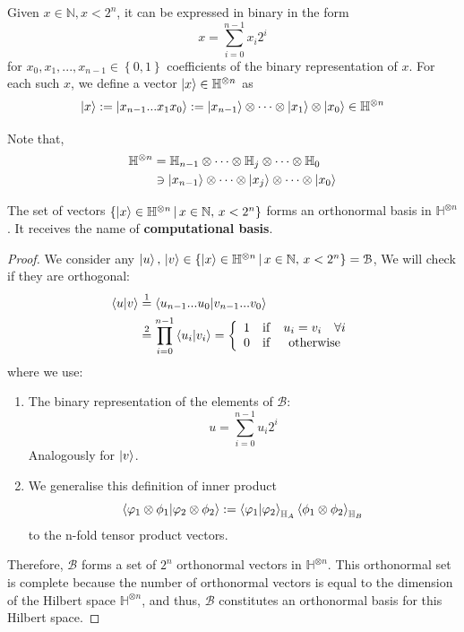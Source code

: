\begin{definicion}
    Given $x\in \mathbb{N}, x < 2^n$, it can be expressed in binary in the form 
    $$x = \sum_{i=0}^{n-1}x_i 2^i$$ 
    for $x_0, x_1,...,x_{n-1} \in \left\lbrace 0,1\right\rbrace$ coefficients of the binary representation of $x$. For each such $x$, we define a vector $\ket{x}\in \mathbb{H}^{\otimes n}$ as
    $$\ket{x} := \ket{x_{n-1}...x_1 x_0} := \ket{x_{n-1}} \otimes \cdots \otimes \ket{x_1} \otimes \ket{x_0} \in \mathbb{H}^{\otimes n}$$
\end{definicion}

Note that,
\begin{align}
    \mathbb{H}^{\otimes n} &= \mathbb{H}_{n-1} \otimes \cdots \otimes \mathbb{H}_j \otimes \cdots \otimes \mathbb{H}_0 \\
    &\ni \ket{x_{n-1}} \otimes \cdots \otimes \ket{x_j} \otimes \cdots \otimes \ket{x_0}
\end{align}

\begin{proposicion}
    The set of vectors $\left\lbrace \ket{x} \in \mathbb{H}^{\otimes n} \,|\, x \in \mathbb{N},\, x<2^n \right\rbrace$ forms an orthonormal basis in $\mathbb{H}^{\otimes n}$.  It receives the name of \textbf{computational basis}.
\end{proposicion}
\begin{proof}
    We consider any $\ket{u},\, \ket{v} \in \left\lbrace \ket{x} \in \mathbb{H}^{\otimes n} \,|\, x \in \mathbb{N},\, x<2^n \right\rbrace = \mathcal{B}$, We will check if they are orthogonal:
    \begin{align}
        \braket{u |v} &\stackrel{1}{=} \braket{u_{n-1}...u_0 | v_{n-1}... v_0} \\
        &\stackrel{2}{=} \prod_{i=0}^{n-1} \braket{u_i|v_i} = 
        \left\{ \begin{array}{lcc} 
        1 & \mathrm{if} & u_i = v_i \quad \forall i \\
        0 & \mathrm{if} & \text{otherwise} 
        \end{array} \right.
    \end{align}
    where we use: 
    \begin{enumerate}
        \item The binary representation of the elements of $\mathcal{B}$: 
        $$u = \sum_{i=0}^{n-1}u_i 2^i$$
        Analogously for $\ket{v}$.
        \item We generalise this definition of inner product
        $$\braket{\varphi_1 \otimes \phi_1 | \varphi_2 \otimes \phi_2} := \braket{\varphi_1|\varphi_2}_{\mathbb{H}_A} \braket{\phi_1 \otimes \phi_2}_{\mathbb{H}_B}$$
        to the n-fold tensor product vectors.
    \end{enumerate}

    Therefore, $\mathcal{B}$ forms a set of $2^n$ orthonormal vectors in $\mathbb{H}^{\otimes n}$. This orthonormal set is complete because the number of orthonormal vectors is equal to the dimension of the Hilbert space $\mathbb{H}^{\otimes n}$, and thus, $\mathcal{B}$ constitutes an orthonormal basis for this Hilbert space. 
\end{proof}

